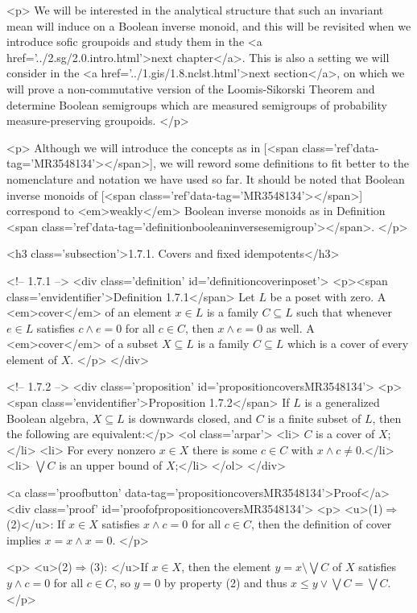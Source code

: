 <p>
We will be interested in the analytical structure that such an invariant mean will induce on a Boolean inverse monoid, and this will be revisited when we introduce sofic groupoids and study them in the <a href='../2.sg/2.0.intro.html'>next chapter</a>. This is also a setting we will consider in the <a href='../1.gis/1.8.nclst.html'>next section</a>, on which we will prove a non-commutative version of the Loomis-Sikorski Theorem and determine Boolean semigroups which are measured semigroups of probability measure-preserving groupoids.
</p>

<p>
Although we will introduce the concepts as in [<span class='ref'data-tag='MR3548134'></span>], we will reword some definitions to fit better to the nomenclature and notation we have used so far. It should be noted that Boolean inverse monoids of [<span class='ref'data-tag='MR3548134'></span>] correspond to <em>weakly</em> Boolean inverse monoids as in Definition <span class='ref'data-tag='definitionbooleaninversesemigroup'></span>.
</p>

<h3 class='subsection'>1.7.1. Covers and fixed idempotents</h3>

<!-- 1.7.1 -->
<div class='definition' id='definitioncoverinposet'>
	<p><span class='envidentifier'>Definition 1.7.1</span>
	Let $L$ be a poset with zero. A <em>cover</em> of an element $x\in L$ is a family $C\subseteq L$ such that whenever $e\in L$ satisfies $c\land e=0$ for all $c\in C$, then $x\land e=0$ as well. A <em>cover</em> of a subset $X\subseteq L$ is a family $C\subseteq L$ which is a cover of every element of $X$.
	</p>
</div>

<!-- 1.7.2 -->
<div class='proposition' id='propositioncoversMR3548134'>
	<p><span class='envidentifier'>Proposition 1.7.2</span>
	If $L$ is a generalized Boolean algebra, $X\subseteq L$ is downwards closed, and $C$ is a finite subset of $L$, then the following are equivalent:</p>
	<ol class='arpar'>
		<li> $C$ is a cover of $X$;</li>
		<li> For every nonzero $x\in X$ there is some $c\in C$ with $x\land c\neq 0$.</li>
		<li> $\bigvee C$ is an upper bound of $X$;</li>
	</ol>
</div>

<a class='proofbutton' data-tag='propositioncoversMR3548134'>Proof</a>
<div class='proof' id='proofofpropositioncoversMR3548134'>
	<p>
	<u>(1)$\Rightarrow$(2)</u>: If $x\in X$ satisfies $x\land c=0$ for all $c\in C$, then the definition of cover implies $x=x\land x=0$.
	</p>

	<p>
	<u>(2)$\Rightarrow$(3): </u>If $x\in X$, then the element $y=x\setminus\bigvee C$ of $X$ satisfies $y\land c=0$ for all $c\in C$, so $y=0$ by property (2) and thus $x\leq y\lor\bigvee C=\bigvee C$.
	</p>

